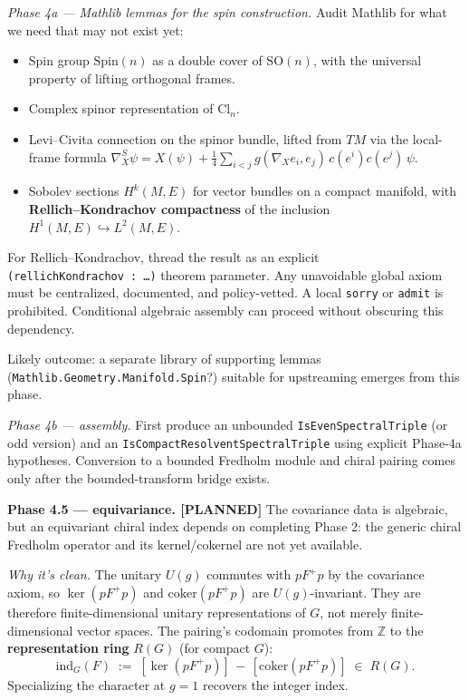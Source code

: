 \documentclass[
  11pt,
]{article}
\providecommand{\tightlist}{%
  \setlength{\itemsep}{0pt}\setlength{\parskip}{0pt}}
\begin{document}
\emph{Phase 4a --- Mathlib lemmas for the spin construction.} Audit
Mathlib for what we need that may not exist yet:

\begin{itemize}
\tightlist
\item
  Spin group \(\mathrm{Spin}(n)\) as a double cover of
  \(\mathrm{SO}(n)\), with the universal property of lifting orthogonal
  frames.
\item
  Complex spinor representation of \(\mathrm{Cl}_n\).
\item
  Levi--Civita connection on the spinor bundle, lifted from \(TM\) via
  the local-frame formula
  \(\nabla^S_X \psi = X(\psi) + \tfrac{1}{4}\sum_{i<j} g(\nabla_X e_i, e_j)\,c(e^i)c(e^j)\,\psi\).
\item
  Sobolev sections \(H^k(M, E)\) for vector bundles on a compact
  manifold, with \textbf{Rellich--Kondrachov compactness} of the
  inclusion \(H^1(M, E) \hookrightarrow L^2(M, E)\).
\end{itemize}

For Rellich--Kondrachov, thread the result as an explicit
\texttt{(rellichKondrachov\ :\ …)} theorem parameter. Any unavoidable
global axiom must be centralized, documented, and policy-vetted. A local
\texttt{sorry} or \texttt{admit} is prohibited. Conditional algebraic
assembly can proceed without obscuring this dependency.

Likely outcome: a separate library of supporting lemmas
(\texttt{Mathlib.Geometry.Manifold.Spin}?) suitable for upstreaming
emerges from this phase.

\emph{Phase 4b --- assembly.} First produce an unbounded
\texttt{IsEvenSpectralTriple} (or odd version) and an
\texttt{IsCompactResolventSpectralTriple} using explicit Phase-4a
hypotheses. Conversion to a bounded Fredholm module and chiral pairing
comes only after the bounded-transform bridge exists.

\textbf{Phase 4.5 --- equivariance. [PLANNED]} The covariance data is
algebraic, but an equivariant chiral index depends on completing Phase 2:
the generic chiral Fredholm operator and its kernel/cokernel are not yet
available.

\emph{Why it's clean.} The unitary \(U(g)\) commutes with \(pF^+p\) by
the covariance axiom, so \(\ker(pF^+p)\) and \(\mathrm{coker}(pF^+p)\)
are \(U(g)\)-invariant. They are therefore finite-dimensional unitary
representations of \(G\), not merely finite-dimensional vector spaces.
The pairing's codomain promotes from \(\mathbb{Z}\) to the
\textbf{representation ring} \(R(G)\) (for compact \(G\)): \[
\mathrm{ind}_G(F) \;:=\; [\ker(pF^+p)] \,-\, [\mathrm{coker}(pF^+p)] \;\in\; R(G).
\] Specializing the character at \(g = 1\) recovers the integer index.
\end{document}
